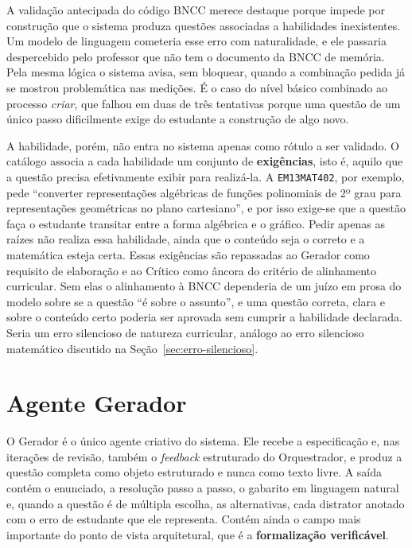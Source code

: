 A validação antecipada do código BNCC merece destaque porque impede por construção que o sistema
produza questões associadas a habilidades inexistentes. Um modelo de linguagem cometeria esse erro
com naturalidade, e ele passaria despercebido pelo professor que não tem o documento da BNCC de
memória. Pela mesma lógica o sistema avisa, sem bloquear, quando a combinação pedida já se mostrou
problemática nas medições. É o caso do nível básico combinado ao processo \emph{criar}, que falhou
em duas de três tentativas porque uma questão de um único passo dificilmente exige do estudante a
construção de algo novo.

A habilidade, porém, não entra no sistema apenas como rótulo a ser validado. O catálogo associa a
cada habilidade um conjunto de \textbf{exigências}, isto é, aquilo que a questão precisa
efetivamente exibir para realizá-la. A \texttt{EM13MAT402}, por exemplo, pede ``converter
representações algébricas de funções polinomiais de 2º grau para representações geométricas no
plano cartesiano'', e por isso exige-se que a questão faça o estudante transitar entre a forma
algébrica e o gráfico. Pedir apenas as raízes não realiza essa habilidade, ainda que o conteúdo
seja o correto e a matemática esteja certa. Essas exigências são repassadas ao Gerador como
requisito de elaboração e ao Crítico como âncora do critério de alinhamento curricular. Sem elas o
alinhamento à BNCC dependeria de um juízo em prosa do modelo sobre se a questão ``é sobre o
assunto'', e uma questão correta, clara e sobre o conteúdo certo poderia ser aprovada sem cumprir a
habilidade declarada. Seria um erro silencioso de natureza curricular, análogo ao erro silencioso
matemático discutido na Seção~\ref{sec:erro-silencioso}.

\section{Agente Gerador}
\label{sec:ag-gerador}

O Gerador é o único agente criativo do sistema. Ele recebe a especificação e, nas iterações de
revisão, também o \emph{feedback} estruturado do Orquestrador, e produz a questão completa como
objeto estruturado e nunca como texto livre. A saída contém o enunciado, a resolução passo a passo,
o gabarito em linguagem natural e, quando a questão é de múltipla escolha, as alternativas, cada
distrator anotado com o erro de estudante que ele representa. Contém ainda o campo mais importante
do ponto de vista arquitetural, que é a \textbf{formalização verificável}.

